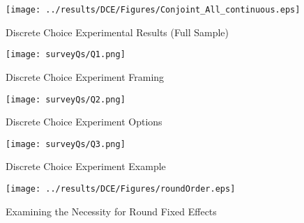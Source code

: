 \documentclass[a4paper, 11pt]{article}
\begin{document}
\begin{figure}[htpb!]
  \begin{center}
    \caption{Discrete Choice Experimental Results (Full Sample)}
    \label{DCE-sampFull}
  \texttt{[image: ../results/DCE/Figures/Conjoint\_All\_continuous.eps]}
  \end{center}
\end{figure}








\begin{figure}[htpb!]
  \begin{center}
    \caption{Discrete Choice Experiment Framing}
    \label{DCE-frame}
  \texttt{[image: surveyQs/Q1.png]}
  \end{center}
\end{figure}

\begin{figure}[htpb!]
  \begin{center}
    \caption{Discrete Choice Experiment Options}
    \label{DCE-options}
  \texttt{[image: surveyQs/Q2.png]}
  \end{center}
\end{figure}

\begin{figure}[htpb!]
  \begin{center}
    \caption{Discrete Choice Experiment Example}
    \label{DCE-example}
  \texttt{[image: surveyQs/Q3.png]}
  \end{center}
\end{figure}


\begin{figure}[htpb!]
  \begin{center}
    \caption{Examining the Necessity for Round Fixed Effects}
    \label{DCE-asm2}
  \texttt{[image: ../results/DCE/Figures/roundOrder.eps]}
  \end{center}
\end{figure}
\end{document}
